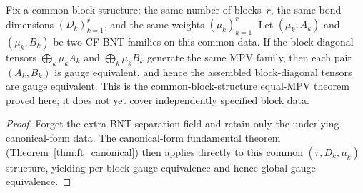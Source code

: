\begin{theorem}\label{thm:ft_equal}
	\leanok
	Fix a common block structure: the same number of blocks~$r$,
	the same bond dimensions $(D_k)_{k=1}^r$, and the same weights
	$(\mu_k)_{k=1}^r$.
	Let $(\mu_k, A_k)$ and $(\mu_k, B_k)$ be two CF-BNT families on
	this common data.
	If the block-diagonal tensors
	$\bigoplus_k \mu_k A_k$ and $\bigoplus_k \mu_k B_k$
	generate the same MPV family, then each pair $(A_k, B_k)$ is
	gauge equivalent, and hence the assembled block-diagonal tensors
	are gauge equivalent.
	This is the common-block-structure equal-MPV theorem proved here;
	it does not yet cover independently specified block data.
\end{theorem}

\begin{proof}
	\leanok
	Forget the extra BNT-separation field and retain only the
	underlying canonical-form data.
	The canonical-form fundamental theorem
	(Theorem~\ref{thm:ft_canonical}) then applies directly to this
	common $(r, D_k, \mu_k)$ structure, yielding per-block gauge
	equivalence and hence global gauge equivalence.
\end{proof}

